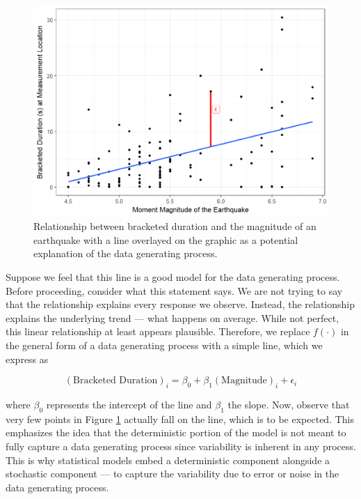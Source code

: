\documentclass[]{book}
\theoremstyle{plain}
\theoremstyle{mydefn}
\theoremstyle{myexmpl}
\theoremstyle{remark}
\begin{document}
\begin{figure}

{\centering \includegraphics[width=0.8\linewidth]{./Images/regmodel-slr-plot-1} 

}

\caption{Relationship between bracketed duration and the magnitude of an earthquake with a line overlayed on the graphic as a potential explanation of the data generating process.}\label{fig:regmodel-slr-plot}
\end{figure}

Suppose we feel that this line is a good model for the data generating
process. Before proceeding, consider what this statement says. We are
not trying to say that the relationship explains every response we
observe. Instead, the relationship explains the underlying trend ---
what happens on average. While not perfect, this linear relationship at
least appears plausible. Therefore, we replace \(f(\cdot)\) in the
general form of a data generating process with a simple line, which we
express as

\begin{equation}
  (\text{Bracketed Duration})_i = \beta_0 + \beta_1(\text{Magnitude})_i + \epsilon_i
  \label{eq:regmodel-slr}
\end{equation}

where \(\beta_0\) represents the intercept of the line and \(\beta_1\)
the slope. Now, observe that very few points in Figure
\ref{fig:regmodel-slr-plot} actually fall on the line, which is to be
expected. This emphasizes the idea that the deterministic portion of the
model is not meant to fully capture a data generating process since
variability is inherent in any process. This is why statistical models
embed a deterministic component alongside a stochastic component --- to
capture the variability due to error or noise in the data generating
process.
\end{document}
